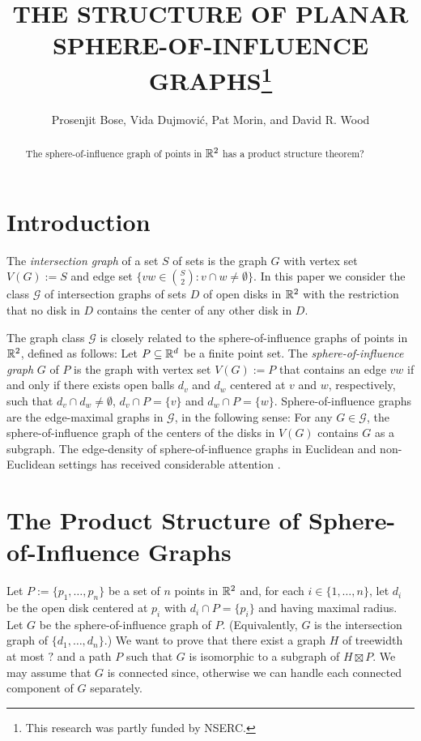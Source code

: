 \documentclass{patmorin}
\title{\MakeUppercase{The Structure of Planar Sphere-of-Influence Graphs}\thanks{This research was partly funded by NSERC.}}
\author{Prosenjit Bose, Vida Dujmović, Pat Morin, and David R. Wood}
\date{}
\begin{document}
\maketitle

\begin{abstract}
    The sphere-of-influence graph of points in $\mathbb{R}^2$ has a product structure theorem?
\end{abstract}

\section{Introduction}

The \emph{intersection graph} of a set $S$ of sets is the graph $G$ with vertex set $V(G):=S$ and edge set $\{vw\in\binom{S}{2}: v\cap w\neq\emptyset\}$.  In this paper we consider the class $\mathcal{G}$ of intersection graphs of sets $D$ of open disks in $\mathbb{R}^2$ with the restriction that no disk in $D$ contains the center of any other disk in $D$.

The graph class $\mathcal{G}$ is closely related to the sphere-of-influence graphs of points in $\mathbb{R}^2$, defined as follows:  Let $P\subseteq\mathbb{R}^d$ be a finite point set.  The \emph{sphere-of-influence graph} $G$ of $P$ is the graph with vertex set $V(G):=P$ that contains an edge $vw$ if and only if there exists open balls $d_v$ and $d_w$ centered at $v$ and $w$, respectively, such that $d_v\cap d_w\neq \emptyset$, $d_v\cap P=\{v\}$ and $d_w\cap P=\{w\}$.  Sphere-of-influence graphs are the edge-maximal graphs in $\mathcal{G}$, in the following sense: For any $G\in\mathcal{G}$, the sphere-of-influence graph of the centers of the disks in $V(G)$ contains $G$ as a subgraph.  The edge-density of sphere-of-influence graphs in Euclidean and non-Euclidean settings has received considerable attention  \cite{avis.horton:,michael.quint:sphere,soss:on,ismailescu.kim.ea:improved, dwyer:expected}.


\section{The Product Structure of Sphere-of-Influence Graphs}

Let $P:=\{p_1,\ldots,p_n\}$ be a set of $n$ points in $\mathbb{R}^2$ and, for each $i\in\{1,\ldots,n\}$, let $d_i$ be the open disk centered at $p_i$ with $d_i\cap P=\{p_i\}$ and having maximal radius.  Let $G$ be the sphere-of-influence graph of $P$.  (Equivalently, $G$ is the intersection graph of $\{d_1,\ldots,d_n\}$.)  We want to prove that there exist a graph $H$ of treewidth at most $?$ and a path $P$ such that $G$ is isomorphic to a subgraph of $H\boxtimes P$. We may assume that $G$ is connected since, otherwise we can handle each connected component of $G$ separately.
\end{document}
